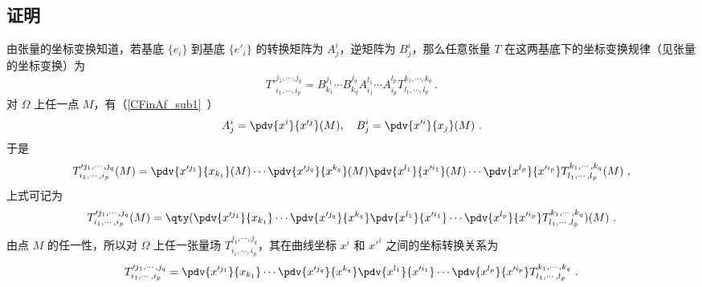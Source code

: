 \subsection{证明}
由张量的坐标变换知道，若基底 $\{e_i\}$ 到基底 $\{e'_i\}$ 的转换矩阵为 $A^i_j$，逆矩阵为 $B^i_j$，那么任意张量 $T$ 在这两基底下的坐标变换规律（见张量的坐标变换）为
\begin{equation}
T'^{j_1,\cdots,j_q}_{i_1,\cdots,i_p}=B^{j_1}_{k_1}\cdots B^{j_q}_{k_q}A^{l_1}_{i_1}\cdots A^{l_p}_{i_p}T^{k_1,\cdots,k_q}_{l_1,\cdots,l_p}~.
\end{equation}
对 $\Omega$ 上任一点 $M$，有（\autoref{CFinAf_sub1}~）
\begin{equation}
A^i_j=\pdv{x^i}{x'^j}(M),\quad B^i_j=\pdv{x'^i}{x_j}(M)~.
\end{equation}
于是
\begin{equation}
T'^{j_1,\cdots,j_q}_{i_1,\cdots,i_p}(M)=\pdv{x'^{j_1}}{x_{k_1}}(M)\cdots \pdv{x'^{j_q}}{x^{k_q}}(M)\pdv{x^{l_1}}{x'^{i_1}}(M)\cdots \pdv{x^{l_p}}{x'^{i_p}}T^{k_1,\cdots,k_q}_{l_1,\cdots,l_p}(M)~,
\end{equation}
上式可记为
\begin{equation}
T'^{j_1,\cdots,j_q}_{i_1,\cdots,i_p}(M)=\qty(\pdv{x'^{j_1}}{x_{k_1}}\cdots \pdv{x'^{j_q}}{x^{k_q}}\pdv{x^{l_1}}{x'^{i_1}}\cdots \pdv{x^{l_p}}{x'^{i_p}}T^{k_1,\cdots,k_q}_{l_1,\cdots,l_p})(M)~.
\end{equation}
由点 $M$ 的任一性，所以对 $\Omega$ 上任一张量场 $T^{j_1,\cdots,j_q}_{i_1,\cdots,i_p}$，其在曲线坐标 $x^i$ 和 $x'^i$ 之间的坐标转换关系为
\begin{equation}
T'^{j_1,\cdots,j_q}_{i_1,\cdots,i_p}=\pdv{x'^{j_1}}{x_{k_1}}\cdots \pdv{x'^{j_q}}{x^{k_q}}\pdv{x^{l_1}}{x'^{i_1}}\cdots \pdv{x^{l_p}}{x'^{i_p}}T^{k_1,\cdots,k_q}_{l_1,\cdots,l_p}~.
\end{equation}



